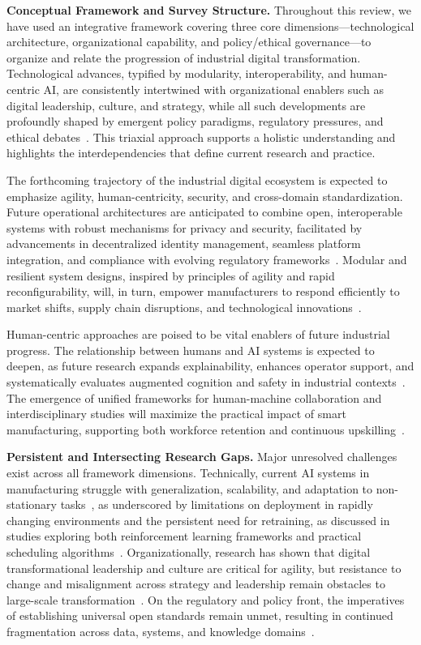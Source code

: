 \documentclass[sigconf]{acmart}
\begin{document}
\vspace{1ex}
\textbf{Conceptual Framework and Survey Structure.} Throughout this review, we have used an integrative framework covering three core dimensions---technological architecture, organizational capability, and policy/ethical governance---to organize and relate the progression of industrial digital transformation. Technological advances, typified by modularity, interoperability, and human-centric AI, are consistently intertwined with organizational enablers such as digital leadership, culture, and strategy, while all such developments are profoundly shaped by emergent policy paradigms, regulatory pressures, and ethical debates~\cite{ref41}\cite{ref86}\cite{ref93}. This triaxial approach supports a holistic understanding and highlights the interdependencies that define current research and practice.

The forthcoming trajectory of the industrial digital ecosystem is expected to emphasize agility, human-centricity, security, and cross-domain standardization. Future operational architectures are anticipated to combine open, interoperable systems with robust mechanisms for privacy and security, facilitated by advancements in decentralized identity management, seamless platform integration, and compliance with evolving regulatory frameworks~\cite{ref41}\cite{ref86}\cite{ref93}. Modular and resilient system designs, inspired by principles of agility and rapid reconfigurability, will, in turn, empower manufacturers to respond efficiently to market shifts, supply chain disruptions, and technological innovations~\cite{ref3}\cite{ref68}.

Human-centric approaches are poised to be vital enablers of future industrial progress. The relationship between humans and AI systems is expected to deepen, as future research expands explainability, enhances operator support, and systematically evaluates augmented cognition and safety in industrial contexts~\cite{ref45}\cite{ref83}. The emergence of unified frameworks for human-machine collaboration and interdisciplinary studies will maximize the practical impact of smart manufacturing, supporting both workforce retention and continuous upskilling~\cite{ref86}\cite{ref94}.

\textbf{Persistent and Intersecting Research Gaps.} Major unresolved challenges exist across all framework dimensions. Technically, current AI systems in manufacturing struggle with generalization, scalability, and adaptation to non-stationary tasks~\cite{ref19}\cite{ref20}\cite{ref54}, as underscored by limitations on deployment in rapidly changing environments and the persistent need for retraining, as discussed in studies exploring both reinforcement learning frameworks and practical scheduling algorithms~\cite{ref13}\cite{ref45}. Organizationally, research has shown that digital transformational leadership and culture are critical for agility, but resistance to change and misalignment across strategy and leadership remain obstacles to large-scale transformation~\cite{ref93}. On the regulatory and policy front, the imperatives of establishing universal open standards remain unmet, resulting in continued fragmentation across data, systems, and knowledge domains~\cite{ref13}\cite{ref86}.
\end{document}
